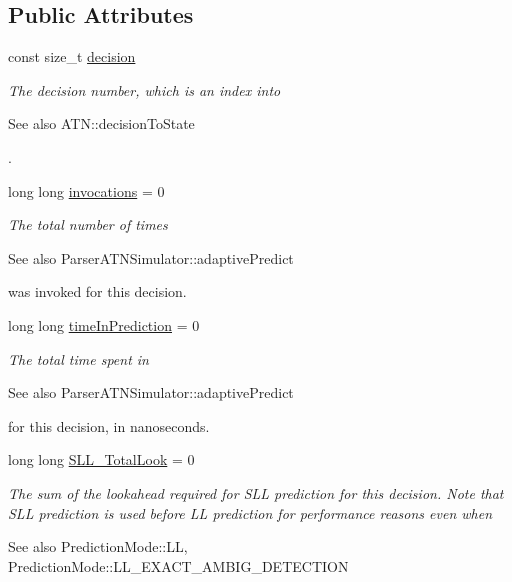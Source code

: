 \subsection*{Public Attributes}
\begin{DoxyCompactItemize}
\item 
const size\+\_\+t \hyperlink{classantlr4_1_1atn_1_1DecisionInfo_ad81f14a210fb5e80f86ac800d56cc7bb}{decision}
\begin{DoxyCompactList}\small\item\em The decision number, which is an index into \begin{DoxySeeAlso}{See also}
A\+T\+N\+::decision\+To\+State


\end{DoxySeeAlso}
. \end{DoxyCompactList}\item 
long long \hyperlink{classantlr4_1_1atn_1_1DecisionInfo_a51da41280fc7b9d27679b2c34bf8c76b}{invocations} = 0
\begin{DoxyCompactList}\small\item\em The total number of times \begin{DoxySeeAlso}{See also}
Parser\+A\+T\+N\+Simulator\+::adaptive\+Predict


\end{DoxySeeAlso}
was invoked for this decision. \end{DoxyCompactList}\item 
long long \hyperlink{classantlr4_1_1atn_1_1DecisionInfo_ae758fc847ab20067a1136393a0ae49c3}{time\+In\+Prediction} = 0
\begin{DoxyCompactList}\small\item\em The total time spent in \begin{DoxySeeAlso}{See also}
Parser\+A\+T\+N\+Simulator\+::adaptive\+Predict


\end{DoxySeeAlso}
for this decision, in nanoseconds. \end{DoxyCompactList}\item 
long long \hyperlink{classantlr4_1_1atn_1_1DecisionInfo_a63d0122173acb50fa288e876220cdb90}{S\+L\+L\+\_\+\+Total\+Look} = 0
\begin{DoxyCompactList}\small\item\em The sum of the lookahead required for S\+LL prediction for this decision. Note that S\+LL prediction is used before LL prediction for performance reasons even when \begin{DoxySeeAlso}{See also}
Prediction\+Mode\+::\+LL, Prediction\+Mode\+::\+L\+L\+\_\+\+E\+X\+A\+C\+T\+\_\+\+A\+M\+B\+I\+G\+\_\+\+D\+E\+T\+E\+C\+T\+I\+ON



\end{DoxySeeAlso}
\end{DoxyCompactList}
\end{DoxyCompactItemize}
